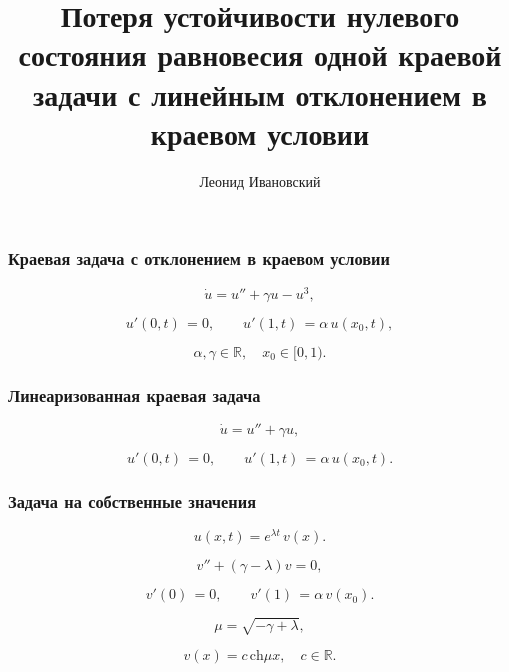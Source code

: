 \documentclass[fullscreen=true, unicode, bookmarks=false]{beamer}
\title[]{ Потеря устойчивости нулевого состояния равновесия одной краевой задачи с линейным отклонением в краевом условии }
\author[]{{\Large Леонид Ивановский}}
\date{}
\institute[]
{  }
\begin{document}
\begin{frame}
\titlepage
\end{frame} 

\begin{frame}
\frametitle{ Краевая задача с отклонением в краевом условии }
 
\begin{equation}
	\dot u = u'' + \gamma u - u^3,	
\end{equation}

\begin{equation}
	u'(0, t) \, = 0, \qquad u'(1, t) \, = \alpha\,u(x_0, t),
\end{equation}

\bigskip

$$ \alpha, \gamma \in \mathbb{R}, \quad x_0 \in [0, 1). $$

\end{frame}

\begin{frame}
\frametitle{ Линеаризованная краевая задача }
 
\begin{equation}
	\dot u = u'' + \gamma u,	
\end{equation}

\begin{equation}	
	u'(0, t) \, = 0, \qquad u'(1, t) \, = \alpha\,u(x_0, t).
\end{equation}

\end{frame}

\begin{frame}
\frametitle{ Задача на собственные значения }
 
$$ u(x, t) = e^{\lambda t} \, v(x). $$

\bigskip
\pause
 
\begin{equation}
	v'' + (\gamma - \lambda)v = 0,	
\end{equation}

\begin{equation}	
	v'(0) \, = 0, \qquad v'(1) \, = \alpha\,v(x_0).
\end{equation}

\bigskip
\pause

$$ \mu = \sqrt{-\gamma + \lambda}, $$

$$ v(x) = c \, \mbox{ch}  \mu x, \quad c \in \mathbb{R}. $$

\end{frame}
\end{document}
